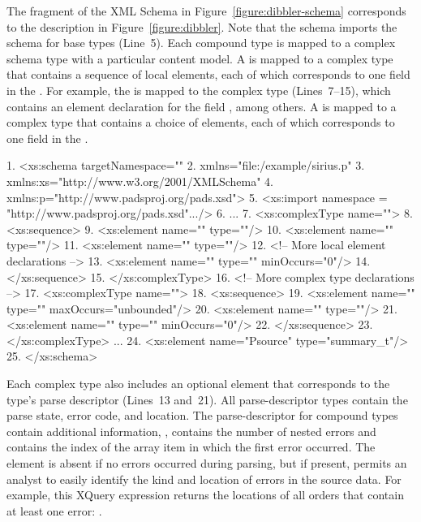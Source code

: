 The fragment of the XML Schema in Figure~\ref{figure:dibbler-schema}
corresponds to the description in Figure~\ref{figure:dibbler}.  Note
that the schema imports the schema for \pads{} base types (Line~5).
Each compound type is mapped to a complex schema type with a
particular content model.  A  is mapped to a complex type
that contains a sequence of local elements, each of which corresponds
to one field in the .  For example, the 
 is mapped to the complex type
 (Lines~7--15), which contains an element
declaration for the field , among others.  A
 is mapped to a complex type that contains a choice of
elements, each of which corresponds to one field in the .
\begin{figure*}
\begin{small}
\begin{code}
{ 1}. <xs:schema targetNamespace=""
{ 2}.            xmlns="file:/example/sirius.p"
{ 3}.            xmlns:xs="http://www.w3.org/2001/XMLSchema"
{ 4}.            xmlns:p="http://www.padsproj.org/pads.xsd">
{ 5}. <xs:import namespace = "http://www.padsproj.org/pads.xsd".../>
{ 6}. ...
{ 7}. <xs:complexType name="">
{ 8}.  <xs:sequence>
{ 9}.   <xs:element name=""     type=""/>
{10}.   <xs:element name="" type=""/>
{11}.   <xs:element name=""   type=""/>
{12}.   <!-- More local element declarations -->
{13}.   <xs:element name=""            type="" minOccurs="0"/>
{14}.  </xs:sequence>
{15}. </xs:complexType>
{16}. <!-- More complex type declarations -->
{17}. <xs:complexType name="">
{18}.  <xs:sequence>
{19}.   <xs:element name=""    type="" maxOccurs="unbounded"/>
{20}.   <xs:element name="" type=""/>
{21}.   <xs:element name=""     type="" minOccurs="0"/>
{22}.  </xs:sequence>
{23}. </xs:complexType>
     ...
{24}. <xs:element name="Psource" type="summary_t"/>
{25}. </xs:schema>
\end{code}
\end{small}
\caption{Fragment of XML Schema for \dibbler{} \pads{} description.}
\label{figure:dibbler-schema}
\end{figure*}

Each complex type also includes an optional  element that
corresponds to the type's parse descriptor (Lines~13 and~21).  All
parse-descriptor types contain the parse state, error code, and
location.  The parse-descriptor for compound types contain additional
information, \eg{},  contains the number of nested
errors and  contains the index of the array item in
which the first error occurred.  The  element is absent if no
errors occurred during parsing, but if present, permits an analyst to
easily identify the kind and location of errors in the source data.
For example, this XQuery expression returns the locations of all
orders that contain at least one error:
.

